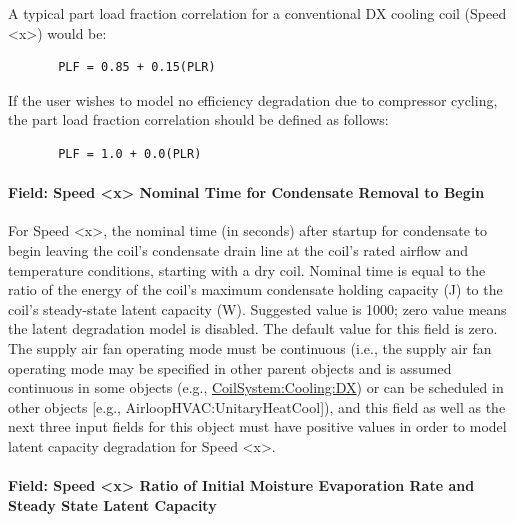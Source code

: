 A typical part load fraction correlation for a conventional DX cooling coil (Speed \textless{}x\textgreater{}) would be:

\begin{lstlisting}
       PLF = 0.85 + 0.15(PLR)
\end{lstlisting}

If the user wishes to model no efficiency degradation due to compressor cycling, the part load fraction correlation should be defined as follows:

\begin{lstlisting}
       PLF = 1.0 + 0.0(PLR)
\end{lstlisting}

\paragraph{Field: Speed \textless{}x\textgreater{} Nominal Time for Condensate Removal to Begin}\label{field-speed-x-nominal-time-for-condensate-removal-to-begin}

For Speed \textless{}x\textgreater{}, the nominal time (in seconds) after startup for condensate to begin leaving the coil's condensate drain line at the coil's rated airflow and temperature conditions, starting with a dry coil. Nominal time is equal to the ratio of the energy of the coil's maximum condensate holding capacity (J) to the coil's steady-state latent capacity (W). Suggested value is 1000; zero value means the latent degradation model is disabled. The default value for this field is zero. The supply air fan operating mode must be continuous (i.e., the supply air fan operating mode may be specified in other parent objects and is assumed continuous in some objects (e.g., \hyperref[coilsystemcoolingdx]{CoilSystem:Cooling:DX}) or can be scheduled in other objects {[}e.g., AirloopHVAC:UnitaryHeatCool{]}), and this field as well as the next three input fields for this object must have positive values in order to model latent capacity degradation for Speed \textless{}x\textgreater{}.

\paragraph{Field: Speed \textless{}x\textgreater{} Ratio of Initial Moisture Evaporation Rate and Steady State Latent Capacity}\label{field-speed-x-ratio-of-initial-moisture-evaporation-rate-and-steady-state-latent-capacity}

